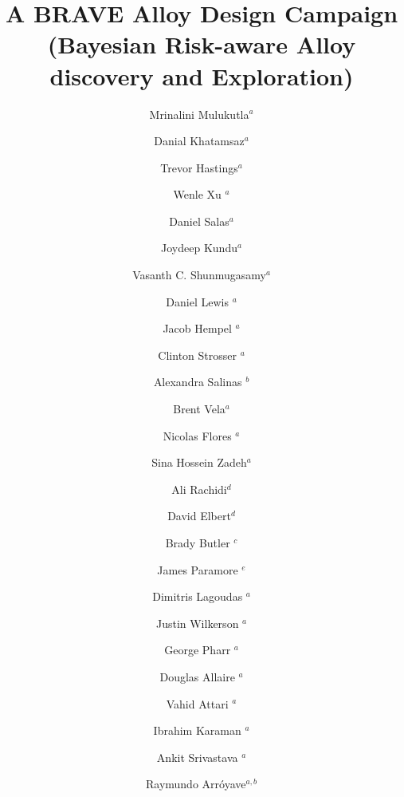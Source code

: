 \documentclass[final,5p,times,twocolumn]{elsarticle}
\begin{document}
\begin{frontmatter}
\title{\Large{A BRAVE Alloy Design Campaign\\
(Bayesian Risk-aware Alloy discovery and Exploration)}}



\author{Mrinalini Mulukutla$^{a}$} 
\author{Danial Khatamsaz$^{a}$}
\author{Trevor Hastings$^{a}$}
\author{Wenle Xu $^{a}$}
\author{Daniel Salas$^{a}$}
\author{Joydeep Kundu$^{a}$}
\author{Vasanth C. Shunmugasamy$^{a}$}
\author{Daniel Lewis $^{a}$}
\author{Jacob Hempel $^{a}$}
\author{Clinton Strosser $^{a}$}
\author{Alexandra Salinas $^{b}$}
\author{Brent Vela$^{a}$}
\author{Nicolas Flores $^{a}$}
\author{Sina Hossein Zadeh$^{a}$}
\author{Ali Rachidi$^{d}$}
\author{David Elbert$^{d}$}
\author{Brady Butler $^{c}$}
\author{James Paramore $^{e}$}
\author{Dimitris Lagoudas $^{a}$}
\author{Justin Wilkerson $^{a}$}
\author{George Pharr $^{a}$}
\author{Douglas Allaire $^{a}$}
\author{Vahid Attari $^{a}$}
\author{Ibrahim Karaman $^{a}$}
\author{Ankit Srivastava $^{a}$}
\author{Raymundo Arr\'{o}yave$^{a,b}$}


\address{$^a$Department of Materials Science and Engineering, Texas A\&M University, College Station, TX 77843, USA}
\address{$^b$Mechanical Engineering Department, Texas A\&M University, College Station, TX, USA 77840}
\address{$^c$DEVCOM Army Research Laboratory South at Texas A\&M University, College Station, TX 77843-3003, USA}
\address{$^d$Hopkins Extreme Materials Institute, Johns Hopkins University, Baltimore, Maryland, 21218, USA}
\address{$^e$Bush Combat Development Complex, Texas A\&M University System, 3479 TAMU, College Station, TX 77843-3479, USA}



\end{frontmatter}
\end{document}

